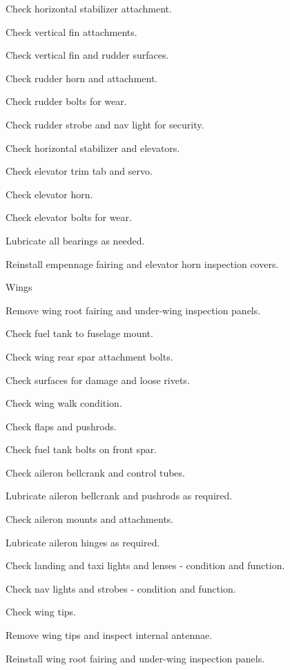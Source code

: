 \begin{enumerate*}
\begin{enumerate*}
		\item Check horizontal stabilizer attachment. 
		\item Check vertical fin attachments. 
		\item Check vertical fin and rudder surfaces. 
		\item Check rudder horn and attachment. 
		\item Check rudder bolts for wear. 
		\item Check rudder strobe and nav light for security. 
		\item Check horizontal stabilizer and elevators. 
		\item Check elevator trim tab and servo. 
		\item Check elevator horn. 
		\item Check elevator bolts for wear. 
		\item Lubricate all bearings as needed. 
		\item Reinstall empennage fairing and elevator horn inspection covers. 
	\end{enumerate*}
	\item{Wings} 
	\begin{enumerate*}
		\item Remove wing root fairing and under-wing inspection panels. 
		\item Check fuel tank to fuselage mount.
		\item Check wing rear spar attachment bolts.
		\item Check surfaces for damage and loose rivets. 
		\item Check wing walk condition.
		\item Check flaps and pushrods.
		\item Check fuel tank bolts on front spar.
		\item Check aileron bellcrank and control tubes.
		\item Lubricate aileron bellcrank and pushrods as required.
		\item Check aileron mounts and attachments.
		\item Lubricate aileron hinges as required.
		\item Check landing and taxi lights and lenses - condition and function.
		\item Check nav lights and strobes - condition and function.
		\item Check wing tips.
		\item Remove wing tips and inspect internal antennae.
		\item Reinstall wing root fairing and under-wing inspection panels. 

\end{enumerate*}
\end{enumerate*}
